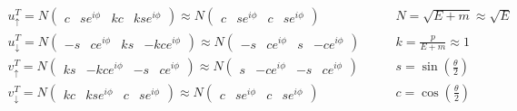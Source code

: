 \begin{align*}
        u_\uparrow^T = N \begin{pmatrix}
                c&se^{i\phi}&kc&kse^{i\phi}
        \end{pmatrix}
        \approx N \begin{pmatrix}
                c&se^{i\phi}&c&se^{i\phi}
        \end{pmatrix}
        &\qquad
        N = \sqrt{E+m} \approx \sqrt{E}
        \\
        u_\downarrow^T = N \begin{pmatrix}
                -s&ce^{i\phi}&ks&-kce^{i\phi}
        \end{pmatrix}
        \approx N \begin{pmatrix}
                -s&ce^{i\phi}&s&-ce^{i\phi}
        \end{pmatrix}
        &\qquad
        k = \frac{p}{E+m} \approx 1
        \\
        v_\uparrow^T = N \begin{pmatrix}
                ks&-kce^{i\phi}&-s&ce^{i\phi}
        \end{pmatrix}
        \approx N \begin{pmatrix}
                s&-ce^{i\phi}&-s&ce^{i\phi}
        \end{pmatrix}
        &\qquad
        s = \sin(\frac{\theta}{2})
        \\
        v_\downarrow^T = N \begin{pmatrix}
                kc&kse^{i\phi}&c&se^{i\phi}
        \end{pmatrix}
        \approx N \begin{pmatrix}
                c&se^{i\phi}&c&se^{i\phi}
        \end{pmatrix}
        &\qquad
        c = \cos(\frac{\theta}{2})
\end{align*}
